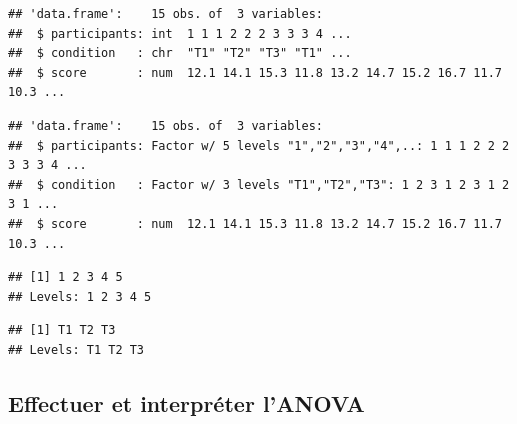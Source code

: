 \documentclass[
]{book}
\newenvironment{Shaded}{\begin{snugshade}}{\end{snugshade}}
\newcommand{\FunctionTok}[1]{\textcolor[rgb]{0.13,0.29,0.53}{\textbf{#1}}}
\newcommand{\NormalTok}[1]{#1}
\newcommand{\OtherTok}[1]{\textcolor[rgb]{0.56,0.35,0.01}{#1}}
\newcommand{\SpecialCharTok}[1]{\textcolor[rgb]{0.81,0.36,0.00}{\textbf{#1}}}
\begin{document}
\begin{verbatim}
## 'data.frame':    15 obs. of  3 variables:
##  $ participants: int  1 1 1 2 2 2 3 3 3 4 ...
##  $ condition   : chr  "T1" "T2" "T3" "T1" ...
##  $ score       : num  12.1 14.1 15.3 11.8 13.2 14.7 15.2 16.7 11.7 10.3 ...
\end{verbatim}

\begin{Shaded}
\end{Shaded}

\begin{verbatim}
## 'data.frame':    15 obs. of  3 variables:
##  $ participants: Factor w/ 5 levels "1","2","3","4",..: 1 1 1 2 2 2 3 3 3 4 ...
##  $ condition   : Factor w/ 3 levels "T1","T2","T3": 1 2 3 1 2 3 1 2 3 1 ...
##  $ score       : num  12.1 14.1 15.3 11.8 13.2 14.7 15.2 16.7 11.7 10.3 ...
\end{verbatim}

\begin{Shaded}
\end{Shaded}

\begin{verbatim}
## [1] 1 2 3 4 5
## Levels: 1 2 3 4 5
\end{verbatim}

\begin{Shaded}
\end{Shaded}

\begin{verbatim}
## [1] T1 T2 T3
## Levels: T1 T2 T3
\end{verbatim}

\subsection{Effectuer et interpréter l'ANOVA}\label{effectuer-et-interpruxe9ter-lanova}
\end{document}
